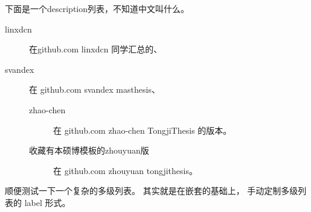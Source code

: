 \documentclass[../Main/thesis]{subfiles}
\begin{document}
下面是一个description列表，不知道中文叫什么。

\begin{description}
  \item [linxdcn] 在github.com linxdcn 同学汇总的、
  \item [svandex] 在 github.com svandex masthesis、
  \begin{description}
    \item [zhao-chen] 在 github.com zhao-chen TongjiThesis 的版本。
    \item [收藏有本硕博模板的zhouyuan版] 在 github.com zhouyuan tongjithesis。
  \end{description}
\end{description}

\zhlipsum[33]

顺便测试一下一个复杂的多级列表。
其实就是在嵌套的基础上， 手动定制多级列表的 label 形式。
\end{document}
